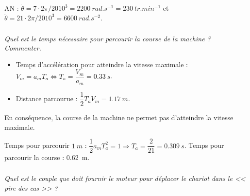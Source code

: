 \begin{multicols}{2}
\begin{corrige}
AN : $\dot{\theta}=7\cdot 2\pi/20 10^3=\SI{2200}{rad.s^{-1}}=\SI{230}{tr.min^{-1}}$ et $\ddot{\theta}=21\cdot 2\pi/20 10^3 = \SI{6600}{rad.s^{-2}}$.
\end{corrige}
\else
\fi

\subparagraph{}
\textit{Quel est le temps nécessaire pour parcourir la course de la machine ? Commenter.}
\ifprof
\begin{corrige}
\begin{itemize}
\item Temps d'accélération pour atteindre la vitesse maximale : $V_m = a_m T_a \Leftrightarrow T_a = \dfrac{V_m}{a_m}=\SI{0,33}{s}$. 
\item Distance parcourue : $\dfrac{1}{2}T_aV_m = \SI{1,17}{m}$. 
\end{itemize}
En conséquence, la course de la machine ne permet pas d'atteindre la vitesse maximale. 

Temps pour parcourir $\SI{1}{m}$ : $\dfrac{1}{2}a_mT_a^2 =1 \Rightarrow T_a = \dfrac{2}{21}=\SI{0,309}{s}$. Temps pour parcourir la course : \SI{0,62}{m}.
\end{corrige}
\else
\fi


\subparagraph{}
\textit{Quel est le couple que doit fournir le moteur pour déplacer le chariot dans le << pire des cas >> ?}
\ifprof
\begin{corrige}
\end{corrige}
\else
\fi



\ifprof
\else
\end{multicols}
\fi

%